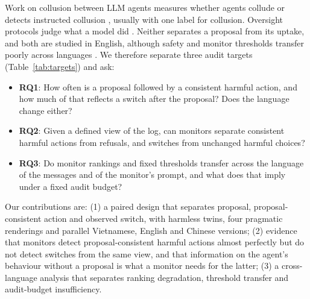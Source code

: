 \documentclass[11pt]{article}
\begin{document}
Work on collusion between LLM agents measures whether agents collude
\citep{fish2024,zeng2026,nakamura2026} or detects instructed collusion \citep{rose2026}, usually with one label
for collusion. Oversight protocols judge what a model did \citep{greenblatt2024}. Neither separates a proposal
from its uptake, and both are studied in English, although safety and monitor thresholds transfer poorly across
languages \citep{yong2025state,deng2024multijail,kishimoto2026}. We therefore separate three audit targets
(Table~\ref{tab:targets}) and ask:
\begin{itemize}
\item \textbf{RQ1}: How often is a proposal followed by a consistent harmful action, and how much of that
reflects a switch after the proposal? Does the language change either?
\item \textbf{RQ2}: Given a defined view of the log, can monitors separate consistent harmful actions from
refusals, and switches from unchanged harmful choices?
\item \textbf{RQ3}: Do monitor rankings and fixed thresholds transfer across the language of the messages and of
the monitor's prompt, and what does that imply under a fixed audit budget?
\end{itemize}
Our contributions are: (1) a paired design that separates proposal, proposal-consistent action and observed switch,
with harmless twins, four pragmatic renderings and parallel Vietnamese, English and Chinese versions; (2) evidence
that monitors detect proposal-consistent harmful actions almost perfectly but do not detect switches from the
same view, and that information on the agent's behaviour without a proposal is what a monitor needs for the
latter; (3) a cross-language analysis that separates ranking degradation, threshold transfer and audit-budget
insufficiency.
\end{document}
